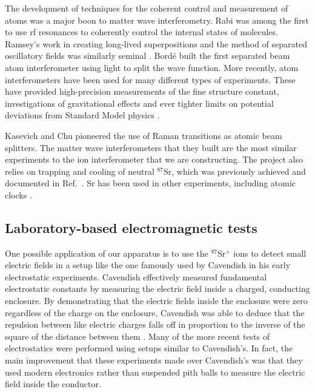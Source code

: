 The development of techniques for the coherent control and measurement of atoms was a major boon to matter wave interferometry\cite{Kronin_RMP}. Rabi was among the first to use rf resonances to coherently control the internal states of molecules\cite{RabiOriginal}\cite{Kronin_RMP}. 
Ramsey's work in creating long-lived superpositions and the method of separated oscillatory fields was similarly seminal \cite{Kronin_RMP}\cite{Ramsey_original}. 
Bord\'e built \cite{borde_interferometer} the first separated beam atom interferometer using light to split the wave function. 
More recently, atom interferometers have been used for many different types of experiments. These have provided high-precision measurements of the fine structure constant\cite{WichtFineStructure}\cite{WeissFineStructure}\cite{GibbleFineStructure}, investigations of gravitational effects \cite{mullerIsotropyGR}\cite{KasevichGravWaves} and ever tighter limits on potential deviations from Standard Model physics\cite{mullerLorentzInvarianceElectrodynamics}  \cite{Kronin_RMP}\cite{KasevichInertial}.

Kasevich and Chu pioneered the use of Raman transitions as atomic beam splitters\cite{kasevichChu1991}. The matter wave interferometers that they built are the most similar experiments to the ion interferometer that we are constructing. 
The project also relies on trapping and cooling of neutral $^{87}$Sr, which was previously achieved and documented in Ref.~\cite{kurosu_trap_sr}. Sr has been used in other experiments, including atomic clocks \cite{ludlow_science}.

\subsection{Laboratory-based electromagnetic tests}

One possible application of our apparatus is to use the $^{87}$Sr$^+$ ions to detect small electric fields in a setup like the one famously used by Cavendish in his early electrostatic experiments. Cavendish effectively measured fundamental electrostatic constants by measuring the electric field inside a charged, conducting enclosure. By demonstrating that the electric fields inside the enclosure were zero regardless of the charge on the enclosure, Cavendish was able to deduce that the repulsion between like electric charges falls off in proportion to the inverse of the square of the distance between them \cite{geodude}. Many of the more recent tests of electrostatics were performed using setups similar to Cavendish's\cite{jackson}.  In fact, the main improvement that these experiments made over Cavendish's was that they used modern electronics rather than suspended pith balls to measure the electric field inside the conductor.

